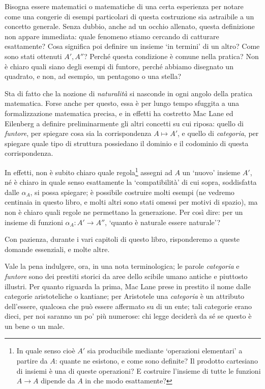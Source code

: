 Bisogna essere matematici o matematiche di una certa esperienza per notare come una congerie di esempi particolari di questa costruzione sia astraibile a un concetto generale. Senza dubbio, anche ad un occhio allenato, questa definizione non appare immediata: quale fenomeno stiamo cercando di catturare esattamente? Cosa significa poi definire un insieme `in termini' di un altro? Come sono stati ottenuti \(A',A''\)? Perché questa condizione è comune nella pratica? Non è chiaro quali siano degli esempi di funtore, perché abbiamo disegnato un quadrato, e non, ad esempio, un pentagono o una stella?

Sta di fatto che la nozione di \emph{naturalità} si nasconde in ogni angolo della pratica matematica. Forse anche per questo, essa è per lungo tempo sfuggita a una formalizzazione matematica precisa, e in effetti ha costretto Mac Lane ed Eilenberg a definire preliminarmente gli altri concetti su cui riposa: quello di \emph{funtore}, per spiegare cosa sia la corrispondenza \(A\mapsto A'\), e quello di \emph{categoria}, per spiegare quale tipo di struttura possiedano il dominio e il codominio di questa corrispondenza.

In effetti, non è subito chiaro quale regola\footnote{In quale senso cioè \(A'\) sia producibile mediante `operazioni elementari' a partire da \(A\): quante ne esistono, e come sono definite? Il prodotto cartesiano di insiemi è una di queste operazioni? E costruire l'insieme di tutte le funzioni \(A\to A\) dipende da $A$ in che modo esattamente?} assegni ad \(A\) un `nuovo' insieme \(A'\), né è chiaro in quale senso esattamente la `compatibilità' di cui sopra, soddisfatta dalle \(\alpha_A\), si possa spiegare; è possibile costruire molti esempi (ne vedremo centinaia in questo libro, e molti altri sono stati omessi per motivi di spazio), ma non è chiaro quali regole ne permettano la generazione. Per così dire: per un insieme di funzioni \(\alpha_A : A' \to A''\), `quanto è naturale essere naturale'?

\medskip
Con pazienza, durante i vari capitoli di questo libro, risponderemo a queste domande essenziali, e molte altre.

\medskip
Vale la pena indulgere, ora, in una nota terminologica; le parole \emph{categoria} e \emph{funtore} sono dei prestiti storici da aree dello scibile umano antiche e piuttosto illustri. Per quanto riguarda la prima, Mac Lane prese in prestito il nome dalle categorie aristoteliche o kantiane; per Aristotele \cite{Barnes2014-wz} una \emph{categoria} è un attributo dell'essere, qualcosa che può essere affermato su di un ente; tali categorie erano dieci, per noi saranno un po' più numerose: chi legge deciderà da sé se questo è un bene o un male.

